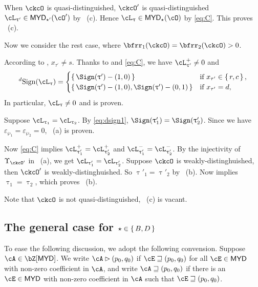 \documentclass[12pt,a4paper]{amsart}
\def\MYD{{\mathsf{MYD}}}
\numberwithin{equation}{section}
\theoremstyle{remark}
\def\uptaup{\uptau^{\prime}}
\def\taup{\tau^{\prime}}
\begin{document}
\smallskip


When $\ckcO$ is quasi-distinguished, $\ckcO'$ is quasi-distinguished
$\ac_{\uptau'}\in \MYD_{\star'}(\cO')$ by
~(c). Hence $\ac_{\uptau}\in \MYD_{\star}(\cO)$ by \eqref{eq:C}. This
proves ~(c).


\medskip

Now we consider the rest case, where $\bfrr_{1}(\ckcO)=\bfrr_{2}(\ckcO)>0$.

According to ,  $x_{\taup}\neq s$.
Thanks to  and \eqref{eq:C}, we have $\pac{\uptaup} \neq 0$ and
\begin{equation}
\label{eq:dsign1}
  \dsign(\ac_{\uptau}) =
  \begin{cases}
    \set{ \Sign(\uptau') - (1,0)} & \text{if } x_{\taup} \in \set{r,c},\\
    \set{ \Sign(\uptau') - (1,0), \Sign(\uptau')-(0,1)} & \text{if
    } x_{\taup} = d, \\
  \end{cases}
\end{equation}
In particular,
$\ac_{\uptau}\neq 0$ and  is proven.


\smallskip


Suppose $\ac_{\uptau_{1}}=\ac_{\uptau_{2}}$. By \eqref{eq:dsign1},
$\Sign(\uptau'_{1})=\Sign(\uptau'_{2})$. Since we have
$\varepsilon_{\wp_{1}}=\varepsilon_{\wp_{2}}=0$, ~(a) is proven.


\smallskip

Now \eqref{eq:C} implies $\pac{\uptau'_{1}}=\pac{\uptau'_{2}}$ and
$\nac{\uptau'_{1}}=\nac{\uptau'_{2}}$.
By the injectivity of $\Upsilon_{\ckcO'}$ in ~(a), we get
$\ac_{\uptau'_{1}}=\ac_{\uptau'_{2}}$.
Suppose $\ckcO$ is weakly-distinghuished, then $\ckcO'$ is
weakly-distinghuished.
So $\uptau'_{1}=\uptau'_{2}$ by ~(b).
Now  implies $\uptau_{1}=\uptau_{2}$, which proves ~(b).


\smallskip

Note that $\ckcO$ is not quasi-distinguished, ~(c) is vacant.


\subsection{The general case for $\star\in \set{B,D}$}

To ease the following discussion, we adopt the following convension.
Suppose $\cA\in \bZ[\MYD]$. We write $\cA\rhd (p_{0},q_{0})$ if
$\cE \sqsupseteq (p_{0},q_{0})$ for all $\cE\in \MYD$ with non-zero coefficient in
$\cA$, and write $\cA \sqsupseteq (p_{0},q_{0})$ if there is an $\cE\in \MYD$ with
non-zero coefficient in $\cA$ such that $\cE\sqsupseteq (p_{0},q_{0})$.
\end{document}
